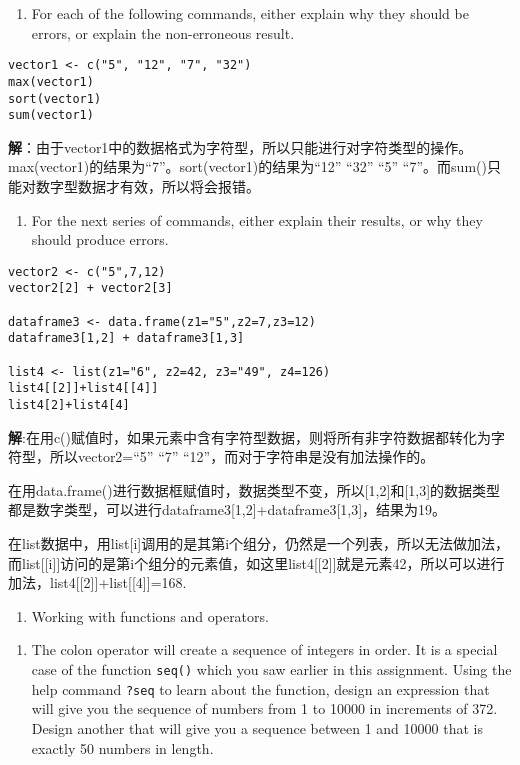 \documentclass[
]{article}
\providecommand{\tightlist}{%
  \setlength{\itemsep}{0pt}\setlength{\parskip}{0pt}}
\begin{document}
\begin{enumerate}
\def\labelenumi{\alph{enumi}.}
\tightlist
\item
  For each of the following commands, either explain why they should be
  errors, or explain the non-erroneous result.
\end{enumerate}

\begin{verbatim}
vector1 <- c("5", "12", "7", "32")
max(vector1)
sort(vector1)
sum(vector1)
\end{verbatim}

\textbf{解}：由于vector1中的数据格式为字符型，所以只能进行对字符类型的操作。max(vector1)的结果为``7''。sort(vector1)的结果为``12''
``32'' ``5'' ``7''。而sum()只能对数字型数据才有效，所以将会报错。

\begin{enumerate}
\def\labelenumi{\alph{enumi}.}
\setcounter{enumi}{1}
\tightlist
\item
  For the next series of commands, either explain their results, or why
  they should produce errors.
\end{enumerate}

\begin{verbatim}
vector2 <- c("5",7,12)
vector2[2] + vector2[3]

dataframe3 <- data.frame(z1="5",z2=7,z3=12)
dataframe3[1,2] + dataframe3[1,3]

list4 <- list(z1="6", z2=42, z3="49", z4=126)
list4[[2]]+list4[[4]]
list4[2]+list4[4]
\end{verbatim}

\textbf{解}:在用c()赋值时，如果元素中含有字符型数据，则将所有非字符数据都转化为字符型，所以vector2=``5''
``7'' ``12''，而对于字符串是没有加法操作的。

在用data.frame()进行数据框赋值时，数据类型不变，所以{[}1,2{]}和{[}1,3{]}的数据类型都是数字类型，可以进行dataframe3{[}1,2{]}+dataframe3{[}1,3{]}，结果为19。

在list数据中，用list{[}i{]}调用的是其第i个组分，仍然是一个列表，所以无法做加法，而list{[}{[}i{]}{]}访问的是第i个组分的元素值，如这里list4{[}{[}2{]}{]}就是元素42，所以可以进行加法，list4{[}{[}2{]}{]}+list{[}{[}4{]}{]}=168.

\begin{enumerate}
\def\labelenumi{\arabic{enumi}.}
\setcounter{enumi}{2}
\tightlist
\item
  Working with functions and operators.
\end{enumerate}

\begin{enumerate}
\def\labelenumi{\alph{enumi}.}
\tightlist
\item
  The colon operator will create a sequence of integers in order. It is
  a special case of the function \texttt{seq()} which you saw earlier in
  this assignment. Using the help command \texttt{?seq} to learn about
  the function, design an expression that will give you the sequence of
  numbers from 1 to 10000 in increments of 372. Design another that will
  give you a sequence between 1 and 10000 that is exactly 50 numbers in
  length.
\end{enumerate}
\end{document}
